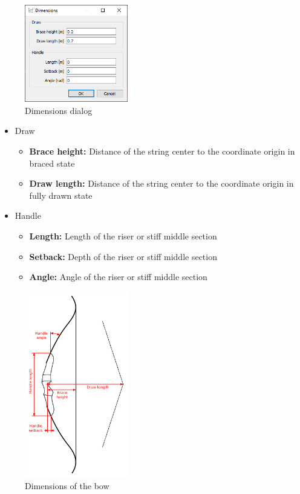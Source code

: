 \documentclass[12pt]{article}
\begin{document}
\begin{figure}[H]
\centering
\includegraphics[width=0.4\textwidth]{figures/screenshots/input/dimensions}
\caption{Dimensions dialog}
\label{fig:dimensions-1}
\end{figure}

\newpage
\begin{itemize}
\item{Draw}
\begin{itemize}
\item \textbf{Brace height:} Distance of the string center to the coordinate origin in braced state
\item \textbf{Draw length:} Distance of the string center to the coordinate origin in fully drawn state
\end{itemize}
\item{Handle}
\begin{itemize}
\item \textbf{Length:} Length of the riser or stiff middle section
\item \textbf{Setback:} Depth of the riser or stiff middle section
\item \textbf{Angle:} Angle of the riser or stiff middle section
\end{itemize}
\end{itemize}

\begin{figure}[H]
\centering
\includegraphics[width=0.4\textwidth]{figures/dimensions}
\caption{Dimensions of the bow}
\label{fig:dimensions-2}
\end{figure}
\end{document}
